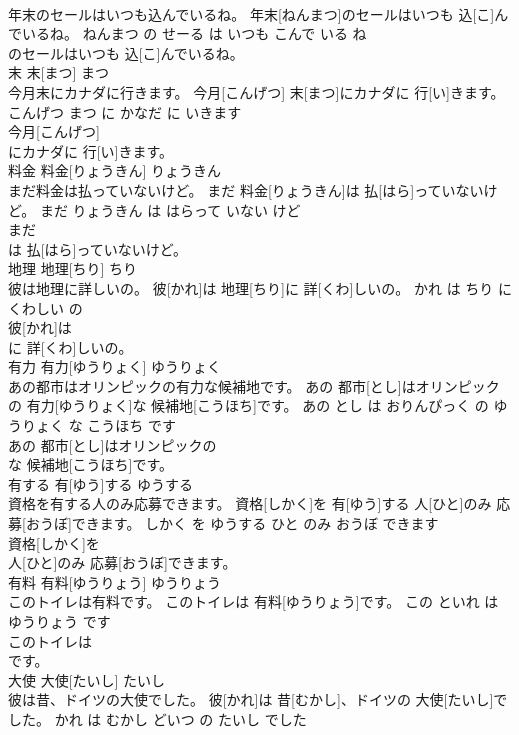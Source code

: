 \documentclass[8pt]{extreport}
\begin{document}
\begin{CJK}{UTF8}{min}
\\	年末のセールはいつも込んでいるね。	年末[ねんまつ]のセールはいつも 込[こ]んでいるね。	ねんまつ の せーる は いつも こんで いる ね	
\\	のセールはいつも 込[こ]んでいるね。			
\\	末	末[まつ]	まつ	
\\	今月末にカナダに行きます。	今月[こんげつ] 末[まつ]にカナダに 行[い]きます。	こんげつ まつ に かなだ に いきます	
\\	今月[こんげつ]
\\	にカナダに 行[い]きます。			
\\	料金	料金[りょうきん]	りょうきん	
\\	まだ料金は払っていないけど。	まだ 料金[りょうきん]は 払[はら]っていないけど。	まだ りょうきん は はらって いない けど	
\\	まだ
\\	は 払[はら]っていないけど。			
\\	地理	地理[ちり]	ちり	
\\	彼は地理に詳しいの。	彼[かれ]は 地理[ちり]に 詳[くわ]しいの。	かれ は ちり に くわしい の	
\\	彼[かれ]は
\\	に 詳[くわ]しいの。			
\\	有力	有力[ゆうりょく]	ゆうりょく	
\\	あの都市はオリンピックの有力な候補地です。	あの 都市[とし]はオリンピックの 有力[ゆうりょく]な 候補地[こうほち]です。	あの とし は おりんぴっく の ゆうりょく な こうほち です	
\\	あの 都市[とし]はオリンピックの
\\	な 候補地[こうほち]です。			
\\	有する	有[ゆう]する	ゆうする	
\\	資格を有する人のみ応募できます。	資格[しかく]を 有[ゆう]する 人[ひと]のみ 応募[おうぼ]できます。	しかく を ゆうする ひと のみ おうぼ できます	
\\	資格[しかく]を
\\	人[ひと]のみ 応募[おうぼ]できます。			
\\	有料	有料[ゆうりょう]	ゆうりょう	
\\	このトイレは有料です。	このトイレは 有料[ゆうりょう]です。	この といれ は ゆうりょう です	
\\	このトイレは
\\	です。			
\\	大使	大使[たいし]	たいし	
\\	彼は昔、ドイツの大使でした。	彼[かれ]は 昔[むかし]、ドイツの 大使[たいし]でした。	かれ は むかし どいつ の たいし でした	

\end{CJK}
\end{document}
